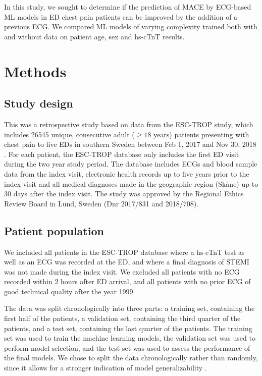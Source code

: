 \documentclass[preprint]{elsarticle}
\begin{document}
In this study, we sought to determine if the prediction of MACE by ECG-based ML models in ED chest pain patients can be improved by the addition of a previous ECG. We compared ML models of varying complexity trained both with and without data on patient age, sex and hs-cTnT results.

\section{Methods}
\subsection{Study design}
This was a retrospective study based on data from the ESC-TROP study, which includes 26545 unique, consecutive adult ($\geq 18$ years) patients presenting with chest pain to five EDs in southern Sweden between Feb 1, 2017 and Nov 30, 2018 \citep{mokhtari2020}. For each patient, the ESC-TROP database only includes the first ED visit during the two year study period. The database includes ECGs and blood sample data from the index visit, electronic health records up to five years prior to the index visit and all medical diagnoses made in the geographic region (Sk\aa{}ne) up to 30 days after the index visit. The study was approved by the Regional Ethics Review Board in Lund, Sweden (Dnr 2017/831 and 2018/708). 
\subsection{Patient population}
We included all patients in the ESC-TROP database where a hs-cTnT test as well as an ECG was recorded at the ED, and where a final diagnosis of STEMI was not made during the index visit. We excluded all patients with no ECG recorded within 2 hours after ED arrival, and all patients with no prior ECG of good technical quality after the year 1999.

The data was split chronologically into three parts: a training set, containing the first half of the patients, a validation set, containing the third quarter of the patients, and a test set, containing the last quarter of the patients. The training set was used to train the machine learning models, the validation set was used to perform model selection, and the test set was used to assess the performance of the final models. We chose to split the data chronologically rather than randomly, since it allows for a stronger indication of model generalizability \citep{steyerberg2009}.
\end{document}
